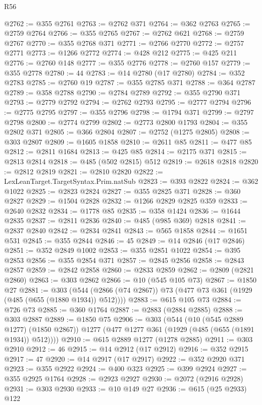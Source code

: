 \begin{lexlean}{R56}
\begin{coremodule}
@2762 := @355 @2761
@2763 := @2762 @371
@2764 := @362 @2763
@2765 := @2759 @2764
@2766 := @355 @2765
@2767 := @2762 @621
@2768 := @2759 @2767
@2770 := @355 @2768 @371
@2771 := @2766 @2770
@2772 := @2757 @2771
@2773 := @1266 @2772
@2774 := @428 @212
@2775 := @425 @211
@2776 := @2760 @148
@2777 := @355 @2776
@2778 := @2760 @157
@2779 := @355 @2778
@2780 := 44
@2783 := @14 @2780 (@17 @2780)
@2784 := @352 @2783
@2785 := @2760 @19
@2787 := @355 @2785 @371
@2788 := @364 @2787
@2789 := @358 @2788
@2790 := @2784 @2789
@2792 := @355 @2790 @371
@2793 := @2779 @2792
@2794 := @2762 @2793
@2795 := @2777 @2794
@2796 := @2775 @2795
@2797 := @355 @2796
@2798 := @1794 @371
@2799 := @2797 @2798
@2800 := @2774 @2799
@2802 := @2773 @2800 @1793
@2804 := @355 @2802 @371
@2805 := @366 @2804
@2807 := @2752 (@1275 @2805)
@2808 := @303 @2807
@2809 := @1605 @1858
@2810 := @2611 @85
@2811 := @477 @85
@2812 := @2811 @1684
@2813 := @425 @85
@2814 := @2175 @371
@2815 := @2813 @2814
@2818 := @485 (@502 @2815) @512
@2819 := @2618 @2818
@2820 := @2812 @2819
@2821 := @2810 @2820
@2822 := LexLeanTarget.TargetSyntax.Prim.natSub
@2823 := @393 @2822
@2824 := @362 @1022
@2825 := @2823 @2824
@2827 := @355 @2825 @371
@2828 := @360 @2827
@2829 := @1504 @2828
@2832 := @1266 @2829 @2825 @359
@2833 := @2640 @2832
@2834 := @1778 @85
@2835 := @358 @1424
@2836 := @1644 @2835
@2837 := @2811 @2836
@2840 := @485 (@985 @369) @2818
@2841 := @2837 @2840
@2842 := @2834 @2841
@2843 := @565 @1858
@2844 := @1651 @531
@2845 := @355 @2844
@2846 := 45
@2849 := @14 @2846 (@17 @2846)
@2851 := @352 @2849 @1002
@2853 := @355 @2851 @1022
@2854 := @395 @2853
@2856 := @355 @2854 @371
@2857 := @2845 @2856
@2858 := @2843 @2857
@2859 := @2842 @2858
@2860 := @2833 @2859
@2862 := @2809 (@2821 @2860)
@2863 := @303 @2862
@2866 := @10 (@545 @105 @73)
@2867 := @1850 @27
@2881 := @303
    (@544 (@2866 (@74 @2867)) @73 (@477 @73 @361 (@1929 (@485 (@655 (@1880 @1934)) @512))))
@2883 := @615 @105 @73
@2884 := @726 @73
@2885 := @360 @1764
@2887 := @2883 (@2884 @2885)
@2888 := @303 @2887
@2889 := @1850 @75
@2906 := @303
    (@544
      (@10 (@545 @2889 @1277) (@1850 @2867))
      @1277
      (@477 @1277 @361 (@1929 (@485 (@655 (@1891 @1934)) @512))))
@2910 := @615 @2889 @1277 (@1278 @2885)
@2911 := @303 @2910
@2912 := 46
@2915 := @14 @2912 (@17 @2912)
@2916 := @352 @2915
@2917 := 47
@2920 := @14 @2917 (@17 @2917)
@2922 := @352 @2920 @371
@2923 := @355 @2922
@2924 := @400 @323
@2925 := @399 @2924
@2927 := @355 @2925 @1764
@2928 := @2923 @2927
@2930 := @2072 (@2916 @2928)
@2931 := @303 @2930
@2933 := @10 @149 @27
@2936 := @615 (@25 @2933) @122

\end{coremodule}
\end{lexlean}
